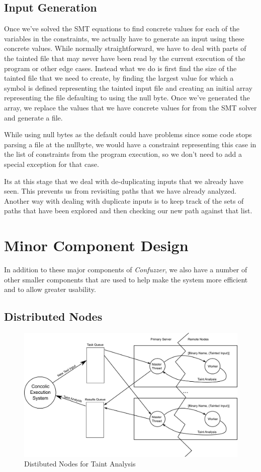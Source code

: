 \subsection{Input Generation}
Once we've solved the SMT equations to find concrete values for each of the
variables in the constraints, we actually have to generate an input using these
concrete values. While normally straightforward, we have to deal with parts of
the tainted file that may never have been read by the current execution of the
program or other edge cases. Instead what we do is first find the size of the
tainted file that we need to create, by finding the largest value for which a
symbol is defined representing the tainted input file and creating an initial
array representing the file defaulting to using the null byte. Once we've
generated the array, we replace the values that we have concrete values for from
the SMT solver and generate a file.

While using null bytes as the default could have problems since some code stops
parsing a file at the nullbyte, we would have a constraint representing this
case in the list of constraints from the program execution, so we don't need to
add a special exception for that case.

Its at this stage that we deal with de-duplicating inputs that we already have
seen. This prevents us from revisiting paths that we have already
analyzed. Another way with dealing with duplicate inputs is to keep track of the
sets of paths that have been explored and then checking our new path against
that list.

\section{Minor Component Design}
In addition to these major components of \textit{Confuzzer}, we also have a
number of other smaller components that are used to help make the system more
efficient and to allow greater usability.

\subsection{Distributed Nodes}
\begin{figure}[ht]
 \centering
 \includegraphics{distnodes}
 \caption{Distibuted Nodes for Taint Analysis}
 \label{figure:distnodes}
\end{figure}

